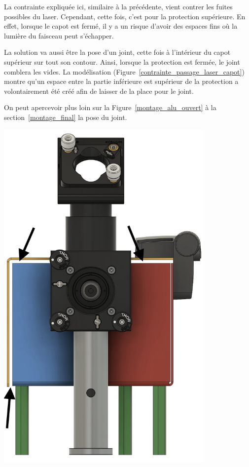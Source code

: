 \begin{minipage}[c]{0.6\textwidth}
    La contrainte expliquée ici, similaire à la précédente, vient contrer les fuites possibles du laser. Cependant, cette fois, c'est pour la protection supérieure. En effet, lorsque le capot est fermé, il y a un risque d'avoir des espaces fins où la lumière du faisceau peut s'échapper.

    La solution va aussi être la pose d'un joint, cette fois à l'intérieur du capot supérieur sur tout son contour. Ainsi, lorsque la protection est fermée, le joint comblera les vides. La modélisation (Figure~\ref{contrainte_passage_laser_capot}) montre qu'un espace entre la partie inférieure est supérieur de la protection a volontairement été créé afin de laisser de la place pour le joint.

    On peut apercevoir plus loin sur la Figure~\ref{montage_alu_ouvert} à la section~\ref{montage_final} la pose du joint.
\end{minipage}\hfill
\begin{minipage}[c]{0.38\textwidth}
    \begin{center}
        \includegraphics[width=0.8\textwidth]{assets/figures/Protections_laser/Securite_mecanique/Protection_entree_laser/contrainte_passage_laser_capot.jpeg}
    \end{center}
    \label{contrainte_passage_laser_capot}
\end{minipage}

